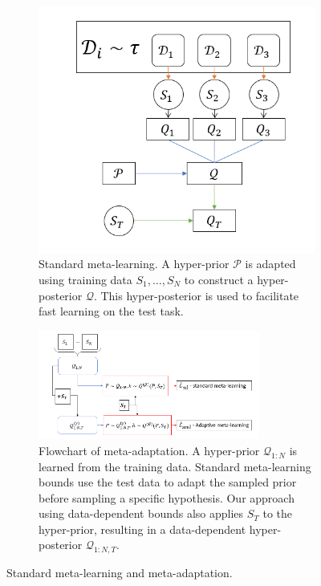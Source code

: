 \documentclass{article} %
\theoremstyle{definition}
\begin{document}
\begin{figure}[h!]
	\centering
	\begin{subfigure}[b]{0.32\textwidth}
		\centering
		\includegraphics[width=\textwidth]{setup_ml.PNG}
	\caption{Standard meta-learning. A hyper-prior $\mathcal{P}$ is adapted using training data $S_1,\ldots,S_N$ to construct a hyper-posterior $\mathcal{Q}$. This hyper-posterior is used to facilitate fast learning on the test task.}
	\label{fig:meta-learning-setting}
	\end{subfigure}
	\hfill
	\begin{subfigure}[b]{0.65\textwidth}
		\centering
		\includegraphics[width=0.8\textwidth]{data_dependant_adaptation}
		\caption{Flowchart of meta-adaptation. A hyper-prior $\mathcal{Q}_{1:N}$ is learned from the training data. Standard meta-learning bounds use the test data to adapt the sampled prior before sampling a specific hypothesis. Our approach using data-dependent bounds also applies $S_T$ to the hyper-prior, resulting in a data-dependent hyper-posterior $\mathcal{Q}_{1:N, T}$. }
	\label{fig:data_dependant_bound}
	\end{subfigure}
	\hfill
	\caption{Standard meta-learning and meta-adaptation.}	 
\end{figure}
\end{document}
